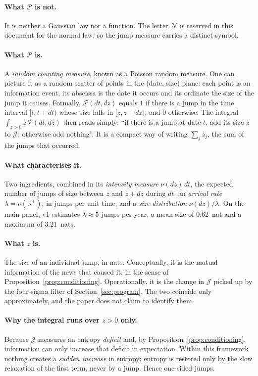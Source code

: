 \documentclass[11pt]{article}
\theoremstyle{definition}
\theoremstyle{remark}
\newcommand{\JJ}{\mathcal{J}}
\begin{document}
\paragraph{What $\mathcal{P}$ is not.} It is neither a Gaussian law nor a
function. The letter $\mathcal N$ is reserved in this document for the normal
law, so the jump measure carries a distinct symbol.

\paragraph{What $\mathcal{P}$ is.} A \emph{random counting measure}, known as a
Poisson random measure. One can picture it as a random scatter of points in the
(date, size) plane: each point is an information event, its abscissa is the date
it occurs and its ordinate the size of the jump it causes. Formally,
$\mathcal{P}(dt,dz)$ equals $1$ if there is a jump in the time interval
$[t,t+dt)$ whose size falls in $[z,z+dz)$, and $0$ otherwise. The integral
$\int_{z>0} z\,\mathcal{P}(dt,dz)$ then reads simply: ``if there is a jump at
date $t$, add its size $z$ to $\JJ$; otherwise add nothing''. It is a compact
way of writing $\sum_{j} z_j$, the sum of the jumps that occurred.

\paragraph{What characterises it.} Two ingredients, combined in its
\emph{intensity measure} $\nu(dz)\,dt$, the expected number of jumps of size
between $z$ and $z+dz$ during $dt$: an \emph{arrival rate}
$\lambda=\nu(\mathbb{R}^+)$, in jumps per unit time, and a \emph{size
distribution} $\nu(dz)/\lambda$. On the main panel, v1 estimates
$\lambda\approx5$ jumps per year, a mean size of $0.62$~nat and a maximum of
$3.21$~nats.

\paragraph{What $z$ is.} The size of an individual jump, in nats. Conceptually, it
is the mutual information of the news that caused it, in the sense of
Proposition~\ref{prop:conditioning}. Operationally, it is the change in $\JJ$
picked up by the four-sigma filter of Section~\ref{sec:program}. The two coincide
only approximately, and the paper does not claim to identify them.

\paragraph{Why the integral runs over $z>0$ only.} Because $\JJ$ measures an
entropy \emph{deficit} and, by Proposition~\ref{prop:conditioning}, information
can only increase that deficit in expectation. Within this framework nothing
creates a \emph{sudden increase} in entropy: entropy is restored only by the slow
relaxation of the first term, never by a jump. Hence one-sided jumps.
\end{document}
